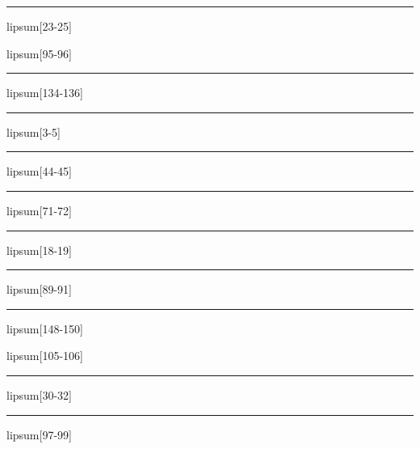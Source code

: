 \documentclass[11pt,a4paper]{article}
\begin{document}
\begin{simplewrap}
  \textcolor{red!15}{\rule{5.5cm}{5.8cm}}
\end{simplewrap}
lipsum[23-25]

lipsum[95-96]

\begin{simplewrap}
  \textcolor{green!48}{\rule{3.1cm}{5.1cm}}
\end{simplewrap}
lipsum[134-136]

\begin{simplewrap}
  \textcolor{blue!59}{\rule{5.5cm}{7.1cm}}
\end{simplewrap}
lipsum[3-5]

\begin{simplewrap}
  \textcolor{cyan!28}{\rule{3.6cm}{8.3cm}}
\end{simplewrap}
lipsum[44-45]

\begin{simplewrap}
  \textcolor{lime!25}{\rule{5.0cm}{9.8cm}}
\end{simplewrap}
lipsum[71-72]

\begin{simplewrap}
  \textcolor{lime!52}{\rule{4.2cm}{6.7cm}}
\end{simplewrap}
lipsum[18-19]

\begin{simplewrap}
  \textcolor{magenta!28}{\rule{5.2cm}{6.5cm}}
\end{simplewrap}
lipsum[89-91]

\begin{simplewrap}
  \textcolor{teal!24}{\rule{4.8cm}{3.6cm}}
\end{simplewrap}
lipsum[148-150]

lipsum[105-106]

\begin{simplewrap}
  \textcolor{cyan!16}{\rule{4.7cm}{6.0cm}}
\end{simplewrap}
lipsum[30-32]

\begin{simplewrap}
  \textcolor{teal!44}{\rule{5.4cm}{6.6cm}}
\end{simplewrap}
lipsum[97-99]
\end{document}
